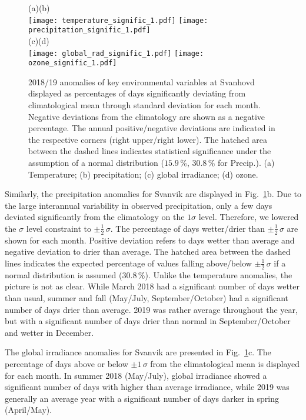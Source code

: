\documentclass[bg, manuscript]{copernicus}
\begin{document}
\begin{figure}[t]
  \centering
  (a)\hspace{8.3cm}(b)\\
  \texttt{[image: temperature\_signific\_1.pdf]}
  \texttt{[image: precipitation\_signific\_1.pdf]}\\
  (c)\hspace{8.3cm}(d)\\
  \texttt{[image: global\_rad\_signific\_1.pdf]}
  \texttt{[image: ozone\_signific\_1.pdf]}
  \caption{2018/19 anomalies of key environmental variables at Svanhovd displayed as percentages of days significantly deviating from climatological mean through standard deviation for each month. Negative deviations from the climatology are shown as a negative percentage. The annual positive/negative deviations are indicated in the respective corners (right upper/right lower). The hatched area between the dashed lines indicates statistical significance under the assumption of a normal distribution ($15.9\,\unit{\%}$, $30.8\,\unit{\%}$ for Precip.). (a) Temperature; (b) precipitation; (c) global irradiance; (d) ozone.}
  \label{fig:anomalies_svanvik}
\end{figure}

Similarly, the precipitation anomalies for Svanvik are displayed in Fig.~\ref{fig:anomalies_svanvik}b. Due to the large interannual variability in observed precipitation, only a few days deviated significantly from the climatology on the $1 \sigma$ level. Therefore, we lowered the $\sigma$ level constraint to $\pm \frac{1}{2}\,\sigma$. The percentage of days wetter/drier than $\pm \frac{1}{2}\,\sigma$ are shown for each month. Positive deviation refers to days wetter than average and negative deviation to drier than average. The hatched area between the dashed lines indicates the expected percentage of values falling above/below $\pm\frac{1}{2}\,\sigma$ if a normal distribution is assumed ($30.8\,\unit{\%}$). Unlike the temperature anomalies, the picture is not as clear. While March 2018 had a significant number of days wetter than usual, summer and fall (May/July, September/October) had a significant number of days drier than average. 2019 was rather average throughout the year, but with a significant number of days drier than normal in September/October and wetter in December.

The global irradiance anomalies for Svanvik are presented in Fig.~\ref{fig:anomalies_svanvik}c. The percentage of days above or below $\pm 1\,\sigma$ from the climatological mean is displayed for each month. In summer 2018 (May/July), global irradiance showed a significant number of days with higher than average irradiance, while 2019 was generally an average year with a significant number of days darker in spring (April/May).
\end{document}
